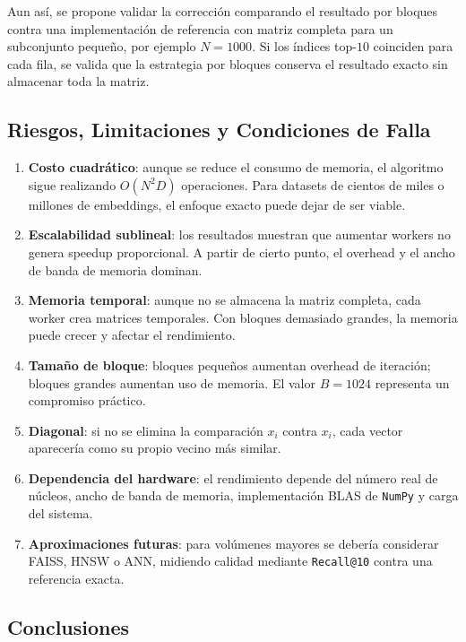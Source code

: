 \documentclass[10pt,a4paper]{article}
\begin{document}
Aun as\'i, se propone validar la correcci\'on comparando el resultado por bloques
contra una implementaci\'on de referencia con matriz completa para un subconjunto
peque\~no, por ejemplo $N=1000$. Si los \'indices top-$10$ coinciden para cada
fila, se valida que la estrategia por bloques conserva el resultado exacto sin
almacenar toda la matriz.

\subsection{Riesgos, Limitaciones y Condiciones de Falla}

\begin{enumerate}
    \item \textbf{Costo cuadr\'atico}: aunque se reduce el consumo de memoria,
        el algoritmo sigue realizando $O(N^2D)$ operaciones. Para datasets de
        cientos de miles o millones de embeddings, el enfoque exacto puede dejar
        de ser viable.
    \item \textbf{Escalabilidad sublineal}: los resultados muestran que aumentar
        workers no genera speedup proporcional. A partir de cierto punto, el
        overhead y el ancho de banda de memoria dominan.
    \item \textbf{Memoria temporal}: aunque no se almacena la matriz completa,
        cada worker crea matrices temporales. Con bloques demasiado grandes,
        la memoria puede crecer y afectar el rendimiento.
    \item \textbf{Tama\~no de bloque}: bloques peque\~nos aumentan overhead de
        iteraci\'on; bloques grandes aumentan uso de memoria. El valor $B=1024$
        representa un compromiso pr\'actico.
    \item \textbf{Diagonal}: si no se elimina la comparaci\'on $x_i$ contra
        $x_i$, cada vector aparecer\'ia como su propio vecino m\'as similar.
    \item \textbf{Dependencia del hardware}: el rendimiento depende del n\'umero
        real de n\'ucleos, ancho de banda de memoria, implementaci\'on BLAS de
        \texttt{NumPy} y carga del sistema.
    \item \textbf{Aproximaciones futuras}: para vol\'umenes mayores se deber\'ia
        considerar FAISS, HNSW o ANN, midiendo calidad mediante \texttt{Recall@10}
        contra una referencia exacta.
\end{enumerate}

\subsection{Conclusiones}
\end{document}

